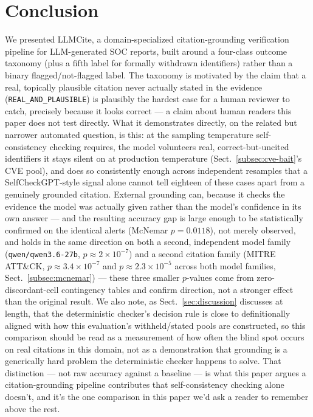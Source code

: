 \documentclass[pdflatex,sn-mathphys-num]{sn-jnl}%
\begin{document}
\section{Conclusion}\label{sec:conclusion}

We presented LLMCite, a domain-specialized citation-grounding
verification pipeline for LLM-generated SOC reports, built around a
four-class outcome taxonomy (plus a fifth label for formally withdrawn
identifiers) rather than a binary flagged/not-flagged label. The
taxonomy is motivated by the claim that a real, topically plausible
citation never actually stated in the evidence
(\texttt{REAL\_AND\_PLAUSIBLE}) is plausibly the hardest case for a
human reviewer to catch, precisely because it looks correct --- a claim
about human readers this paper does not test directly. What it
demonstrates directly, on the related but narrower automated question,
is this: at the sampling temperature self-consistency checking
requires, the model volunteers real, correct-but-uncited identifiers it
stays silent on at production temperature (Sect.~\ref{subsec:cve-bait}'s CVE pool),
and does so consistently enough across independent resamples that a
SelfCheckGPT-style signal alone cannot tell eighteen of these cases
apart from a genuinely grounded citation. External grounding can,
because it checks the evidence the model was actually given rather than
the model's confidence in its own answer --- and the resulting accuracy
gap is large enough to be statistically confirmed on the identical
alerts (McNemar $p=0.0118$), not merely observed, and holds in the same
direction on both a second, independent model family
(\texttt{qwen/qwen3.6-27b}, $p\approx2\times10^{-7}$) and a second
citation family (MITRE ATT\&CK, $p\approx3.4\times10^{-7}$ and
$p\approx2.3\times10^{-5}$ across both model families,
Sect.~\ref{subsec:mcnemar}) --- these three smaller $p$-values come from
zero-discordant-cell contingency tables and confirm direction, not a
stronger effect than the original result. We also note, as
Sect.~\ref{sec:discussion} discusses at length, that the deterministic
checker's decision rule is close to definitionally aligned with how
this evaluation's withheld/stated pools are constructed, so this
comparison should be read as a measurement of how often the blind spot
occurs on real citations in this domain, not as a demonstration that
grounding is a generically hard problem the deterministic checker
happens to solve. That
distinction --- not raw accuracy against a baseline --- is what this
paper argues a citation-grounding pipeline contributes that
self-consistency checking alone doesn't, and it's the one comparison in
this paper we'd ask a reader to remember above the rest.
\end{document}
